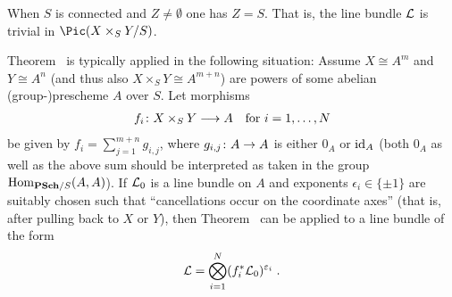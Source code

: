\documentclass[a4paper,parskip=half,numbers=enddot, DIV=12]{scrreprt}
\begin{document}
\begin{rem}
	\begin{alphanumerate}
		\item When $S$ is connected and $Z\neq\emptyset$ one has $Z=S$. That is, the line bundle $\mathcal{L}$ is trivial in $\Pic(X\times_SY/S)$.
		\item Theorem~ is typically applied in the following situation: Assume $X\cong A^m$ and $Y\cong A^n$ (and thus also $X\times_SY\cong A^{m+n}$) are powers of some abelian (group-)prescheme $A$ over $S$. Let morphisms
		\begin{align*}
			f_i\colon X\times_SY\morphism A\quad\text{for }i=1,\ldots,N
		\end{align*}
		be given by $f_i=\sum_{j=1}^{m+n}g_{i,j}$, where $g_{i,j}\colon A\morphism A$ is either $0_A$ or $\operatorname{id}_A$ (both $0_A$ as well as the above sum should be interpreted as taken in the group $\Hom_{\cat{PSch}/S}(A,A)$). If $\mathcal{L}_0$ is a line bundle on $A$ and exponents $\epsilon_i\in\{\pm 1\}$ are suitably chosen such that ``cancellations occur on the coordinate axes'' (that is, after pulling back to $X$ or $Y$), then Theorem~ can be applied to a line bundle of the form 
		\begin{align*}
			\mathcal{L}=\bigotimes_{i=1}^N(f_i^*\mathcal{L}_0)^{\varepsilon_i}\;.
		\end{align*}
	\end{alphanumerate}
\end{rem}
\end{document}
